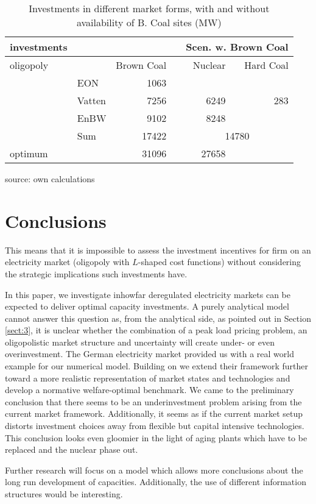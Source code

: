 \begin{table}
\centering
\caption{Investments in different market forms, with and without availability of B. Coal sites (MW)}
\begin{tabular}{llrrrr}
\hline
\hline
investments &            &            &            & \multicolumn{ 2}{r}{Scen. w. Brown Coal} \\
\hline
 oligopoly &            & Brown Coal &            &    Nuclear &  Hard Coal \\
\hline
           &        EON &       1063 &            &            &            \\
           &     Vatten &       7256 &            &       6249 &        283 \\
           &       EnBW &       9102 &            &       8248 &            \\
           &        Sum &      17422 &            & \multicolumn{ 2}{c}{14780} \\
\hline
   optimum &            &      31096 &            &      27658 &            \\
\hline
\hline
\end{tabular}  

\label{tab:invest}
\begin{center}
source: own calculations
\end{center}
\end{table}

\section{Conclusions}

This means that it is impossible to assess the investment incentives for firm on an electricity market (oligopoly with $L$-shaped cost functions) without considering the strategic implications such investments have.

In this paper, we investigate inhowfar deregulated electricity markets can be expected to deliver optimal capacity investments. A purely analytical model cannot answer this question as, from the analytical side, as pointed out in Section \ref{sect:3}, it is unclear whether the combination of a peak load pricing problem, an oligopolistic market structure and uncertainty will create under- or even overinvestment. The German electricity market provided us with a real world example for our numerical model. Building on \cite{Genc2007} we extend their framework further toward a more realistic representation of market states and technologies and develop a normative welfare-optimal benchmark. We came to the preliminary conclusion that there seems to be an underinvestment problem arising from the current market framework. Additionally, it seems as if the current market setup distorts investment choices away from flexible but capital intensive technologies. This conclusion looks even gloomier in the light of aging plants which have to be replaced and the nuclear phase out.

Further research will focus on a model which allows more conclusions about the long run development of capacities. Additionally, the use of different information structures would be interesting.



 
